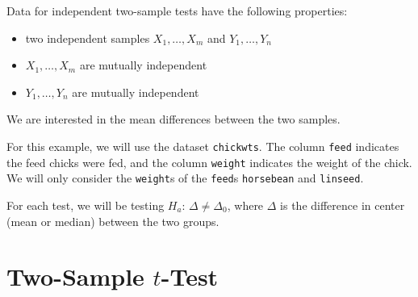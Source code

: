\documentclass[
]{book}
\newenvironment{Shaded}{\begin{snugshade}}{\end{snugshade}}
\newcommand{\CommentTok}[1]{\textcolor[rgb]{0.56,0.35,0.01}{\textit{#1}}}
\newcommand{\KeywordTok}[1]{\textcolor[rgb]{0.13,0.29,0.53}{\textbf{#1}}}
\newcommand{\NormalTok}[1]{#1}
\newcommand{\OperatorTok}[1]{\textcolor[rgb]{0.81,0.36,0.00}{\textbf{#1}}}
\newcommand{\StringTok}[1]{\textcolor[rgb]{0.31,0.60,0.02}{#1}}
\providecommand{\tightlist}{%
  \setlength{\itemsep}{0pt}\setlength{\parskip}{0pt}}
\begin{document}
Data for independent two-sample tests have the following properties:

\begin{itemize}
\tightlist
\item
  two independent samples \(X_1, \dots, X_m\) and \(Y_1, \dots, Y_n\)
\item
  \(X_1, \dots, X_m\) are mutually independent
\item
  \(Y_1, \dots, Y_n\) are mutually independent
\end{itemize}

We are interested in the mean differences between the two samples.

For this example, we will use the dataset \texttt{chickwts}.
The column \texttt{feed} indicates the feed chicks were fed,
and the column \texttt{weight} indicates the weight of the chick.
We will only consider the \texttt{weight}s of the \texttt{feed}s
\texttt{horsebean} and \texttt{linseed}.

\begin{Shaded}
\end{Shaded}

For each test, we will be testing \(H_a\): \(\Delta \neq \Delta_0\),
where \(\Delta\) is the difference in center (mean or median)
between the two groups.

\hypertarget{two-sample-t-test}{%
\section{\texorpdfstring{Two-Sample \(t\)-Test}{Two-Sample t-Test}}\label{two-sample-t-test}}
\end{document}
